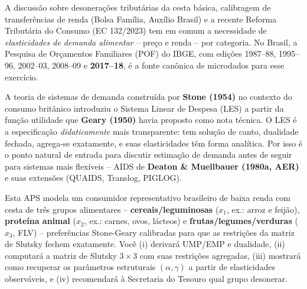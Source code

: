 \documentclass[11pt,addpoints]{exam}
\begin{document}
\begin{contextbox}
\small
A discussão sobre desonerações tributárias da cesta básica, calibragem de transferências de renda (Bolsa Família, Auxílio Brasil) e a recente Reforma Tributária do Consumo (EC 132/2023) tem em comum a necessidade de \emph{elasticidades de demanda alimentar} -- preço e renda -- por categoria. No Brasil, a Pesquisa de Orçamentos Familiares (POF) do IBGE, com edições 1987--88, 1995--96, 2002--03, 2008--09 e \textbf{2017--18}, é a fonte canônica de microdados para esse exercício.

A teoria de sistemas de demanda construída por \textbf{Stone (1954)} no contexto do consumo britânico introduziu o Sistema Linear de Despesa (LES) a partir da função utilidade que \textbf{Geary (1950)} havia proposto como nota técnica. O LES é a especificação \emph{didaticamente} mais transparente: tem solução de canto, dualidade fechada, agrega-se exatamente, e suas elasticidades têm forma analítica. Por isso é o ponto natural de entrada para discutir estimação de demanda antes de seguir para sistemas mais flexíveis -- AIDS de \textbf{Deaton \& Muellbauer (1980a, AER)} e suas extensões (QUAIDS, Translog, PIGLOG).

Esta APS modela um consumidor representativo brasileiro de baixa renda com cesta de três grupos alimentares -- \textbf{cereais/leguminosas} ($x_1$, ex.: arroz e feijão), \textbf{proteína animal} ($x_2$, ex.: carnes, ovos, lácteos) e \textbf{frutas/legumes/verduras} ($x_3$, FLV) -- preferências Stone-Geary calibradas para que as restrições da matriz de Slutsky fechem exatamente. Você (i) derivará UMP/EMP e dualidade, (ii) computará a matriz de Slutsky $3 \times 3$ com suas restrições agregadas, (iii) mostrará como recuperar os parâmetros estruturais $(\alpha, \gamma)$ a partir de elasticidades observáveis, e (iv) recomendará à Secretaria do Tesouro qual grupo desonerar.


\end{contextbox}
\end{document}
